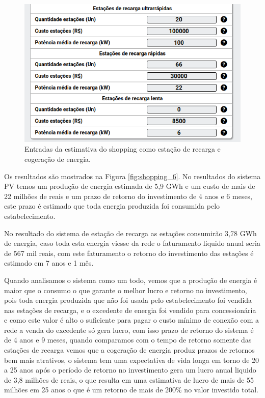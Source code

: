 \begin{figure}[H]
    \centering
    \includegraphics[width=1\textwidth]{./Figuras/shopping_5_2.png}
    \caption{Entradas da estimativa do shopping como estação de recarga e cogeração de energia.}
   \label{fig:shopping_5_2}
\end{figure}

Os resultados são mostrados na Figura \ref{fig:shopping_6}. No resultados do sistema PV temos um produção de energia estimada de 5,9 GWh e um custo de mais de 22 milhões de reais e um prazo de retorno do investimento de 4 anos e 6 meses, este prazo é estimado que toda energia produzida foi consumida pelo estabelecimento.

No resultado do sistema de estação de recarga as estações consumirão 3,78 GWh de energia, caso toda esta energia viesse da rede o faturamento liquido anual seria de 567 mil reais, com este faturamento o retorno do investimento das estações é estimado em 7 anos e 1 mês.

Quando analisamos o sistema como um todo, vemos que a produção de energia é maior que o consumo o que garante o melhor lucro e retorno no investimento, pois toda energia produzida que não foi usada pelo estabelecimento foi vendida nas estações de recarga, e o excedente de energia foi vendido para concessionária e como este valor é alto o suficiente para pagar o custo mínimo de conexão com a rede a venda do excedente só gera lucro, com isso prazo de retorno do sistema é de 4 anos e 9 meses, quando comparamos com o tempo de retorno somente das estações de recarga vemos que a cogeração de energia produz prazos de retornos bem mais atrativos, o sistema tem uma expectativa de vida longa em torno de 20 a 25 anos após o período de retorno no investimento gera um lucro anual liquido de 3,8 milhões de reais, o que resulta em uma estimativa de lucro de mais de 55 milhões em 25 anos o que é um retorno de mais de 200\% no valor investido total.

